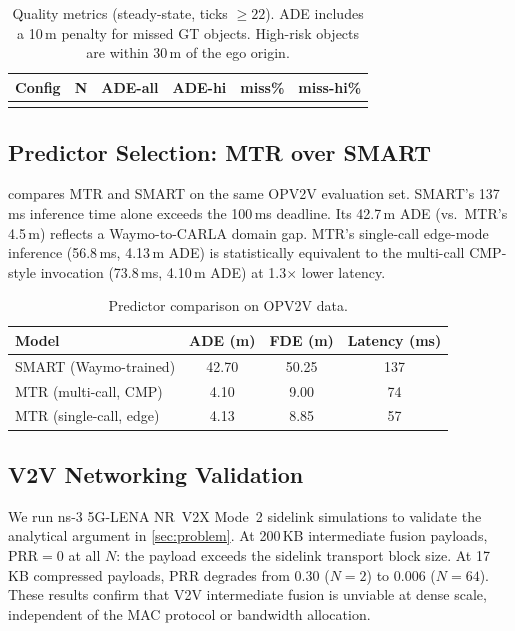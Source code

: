 \begin{table}[t]
\caption{Quality metrics (steady-state, ticks $\geq 22$).  ADE includes
  a 10\,m penalty for missed GT objects.  High-risk objects are within
  30\,m of the ego origin.}
\label{tab:quality}
\small
\begin{tabularx}{\linewidth}{lCCCCC}
\toprule
\textbf{Config} & \textbf{N} & \textbf{ADE-all} & \textbf{ADE-hi}
  & \textbf{miss\%} & \textbf{miss-hi\%} \\
\midrule
{} \\
\bottomrule
\end{tabularx}
\end{table}

\subsection{Predictor Selection: MTR over SMART}

 compares MTR and SMART on the same OPV2V
evaluation set.  SMART's 137\,ms inference time alone exceeds the
100\,ms deadline.  Its 42.7\,m ADE (vs.\ MTR's 4.5\,m) reflects
a Waymo-to-CARLA domain gap.  MTR's single-call edge-mode inference
(56.8\,ms, 4.13\,m ADE) is statistically equivalent to the multi-call
CMP-style invocation (73.8\,ms, 4.10\,m ADE) at 1.3$\times$ lower
latency.

\begin{table}[t]
\caption{Predictor comparison on OPV2V data.}
\label{tab:predictor}
\small
\begin{tabularx}{\linewidth}{lCCC}
\toprule
\textbf{Model} & \textbf{ADE (m)} & \textbf{FDE (m)}
  & \textbf{Latency (ms)} \\
\midrule
SMART (Waymo-trained) & 42.70 & 50.25 & 137 \\
MTR (multi-call, CMP) &  4.10 &  9.00 &  74 \\
MTR (single-call, edge) & 4.13 & 8.85 &  57 \\
\bottomrule
\end{tabularx}
\end{table}

\subsection{V2V Networking Validation}

We run ns-3 5G-LENA NR~V2X Mode~2 sidelink simulations to validate
the analytical argument in \cref{sec:problem}.  At 200\,KB
intermediate fusion payloads, PRR${}=0$ at all $N$: the payload
exceeds the sidelink transport block size.  At 17\,KB compressed
payloads, PRR degrades from 0.30 ($N{=}2$) to 0.006 ($N{=}64$).
These results confirm that V2V intermediate fusion is unviable at
dense scale, independent of the MAC protocol or bandwidth allocation.

